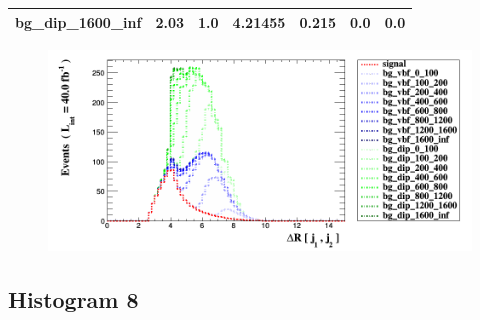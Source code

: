 \documentclass[a4paper, 10pt]{article}
\begin{document}
\begin{table}[H]
\begin{center}
\begin{tabular}{|m{23.0mm}|m{23.0mm}|m{18.0mm}|m{19.0mm}|m{19.0mm}|m{19.0mm}|m{19.0mm}|}
      \hline
      {\cellcolor{white}         bg\_dip\_1600\_inf}& {\cellcolor{white}         2.03}& {\cellcolor{white}         1.0}& {\cellcolor{white}         4.21455}& {\cellcolor{white}         0.215}& {\cellcolor{green}         0.0}& {\cellcolor{green}         0.0}\\
\hline
    \end{tabular}
  \end{center}
\end{table}

\begin{figure}[H]
  \begin{center}
    \includegraphics[scale=0.45]{selection_6.png}\\
\caption{   }
  \end{center}
\end{figure}
      \newpage
\subsection{ Histogram 8}
\end{document}
